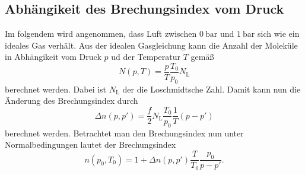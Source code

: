\subsection{Abhängikeit des Brechungsindex vom Druck}
\label{subsec:Brechungsindex}
Im folgendem wird angenommen, dass Luft zwischen $\qty{0}{\bar}$ und $\qty{1}{\bar}$ sich wie ein ideales Gas verhält. Aus der idealen Gasgleichung kann die Anzahl der Moleküle
in Abhängikeit vom Druck $p$ ud der Temperatur $T$ gemäß 
\begin{equation*}
    N(p,T) = \frac{p}{T}\frac{T_0}{p_0}N_\text{L}
\end{equation*}
berechnet werden. Dabei ist $N_\text{L}$ der die Loschmidtsche Zahl. 
Damit kann nun die Änderung des Brechungsindex durch 
\begin{equation*}
    \Delta n(p,p') = \frac{f}{2}N_\text{L}\frac{T_0}{p_0}\frac{1}{T}(p - p')
\end{equation*}
berechnet werden.
Betrachtet man den Brechungsindex nun unter Normalbedingungen lautet der Brechungsindex 
\begin{equation}
    \label{eqn:Brechungsindex_Theorie}
    n(p_0, T_0) = 1 + \Delta n(p,p')\frac{T}{T_0}\frac{p_0}{p - p'}.
\end{equation}
